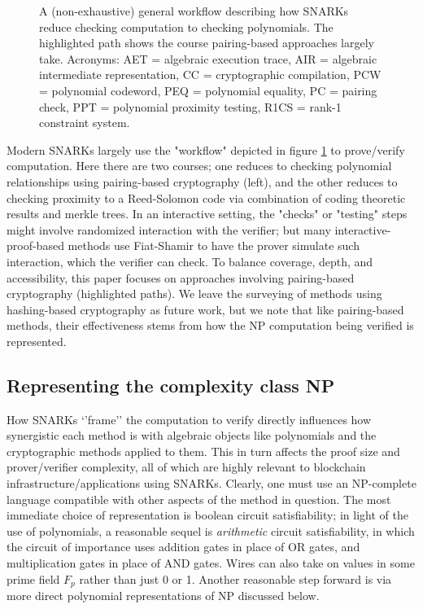 \begin{figure}[htbp]
    \caption{A (non-exhaustive) general workflow describing how SNARKs reduce checking computation to checking polynomials. The highlighted path shows the course pairing-based approaches largely take. Acronyms: AET = algebraic execution trace, AIR = algebraic intermediate representation, CC = cryptographic compilation, PCW = polynomial codeword, PEQ = polynomial equality, PC = pairing check, PPT = polynomial proximity testing, R1CS = rank-1 constraint system.}
    \label{fig:snark-workflow}
\end{figure}
\noindent Modern SNARKs largely use the "workflow" depicted in figure \ref{fig:snark-workflow} to prove/verify computation. Here there are two courses; one reduces to checking polynomial relationships using pairing-based cryptography (left), and the other reduces to checking proximity to a Reed-Solomon code via combination of coding theoretic results and merkle trees. In an interactive setting, the "checks" or "testing" steps might involve randomized interaction with the verifier; but many interactive-proof-based methods use Fiat-Shamir to have the prover simulate such interaction, which the verifier can check. To balance coverage, depth, and accessibility, this paper focuses on approaches involving pairing-based cryptography (highlighted paths). We leave the surveying of methods using hashing-based cryptography as future work, but we note that like pairing-based methods, their effectiveness stems from how the NP computation being verified is represented.

\subsection{Representing the complexity class NP}\label{subsec:np}
\noindent How SNARKs `'frame'' the computation to verify directly influences how synergistic each method is with algebraic objects like polynomials and the cryptographic methods applied to them. This in turn affects the proof size and prover/verifier complexity, all of which are highly relevant to blockchain infrastructure/applications using SNARKs. Clearly, one must use an NP-complete language compatible with other aspects of the method in question. The most immediate choice of representation is boolean circuit satisfiability; in light of the use of polynomials, a reasonable sequel is \textit{arithmetic} circuit satisfiability, in which the circuit of importance uses addition gates in place of OR gates, and multiplication gates in place of AND gates. Wires can also take on values in some prime field $F_p$  rather than just 0 or 1. Another reasonable step forward is via more direct polynomial representations of NP discussed below.

